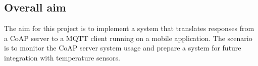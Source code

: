 


\subsection{Overall aim}
\label{ch:intro:overall-aim}
The aim for this project is to implement a system that translates responses from a CoAP server to a MQTT client running on a mobile application. The scenario is to monitor the CoAP server system usage and prepare a system for future integration with temperature sensors. 




